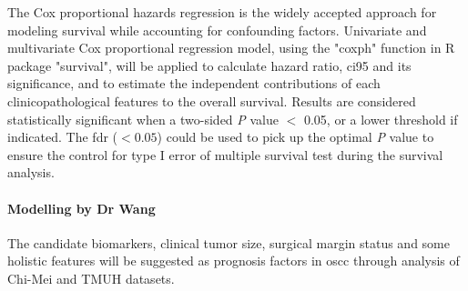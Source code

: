 \documentclass[12pt, a4paper]{article}
\begin{document}

The Cox proportional hazards regression is the widely accepted approach for modeling survival while accounting for confounding factors\cite{Magen2019}. Univariate and multivariate Cox proportional regression model\cite{Andersen1982}, using the "coxph" function in R package "survival", will be applied to calculate hazard ratio, \acrfull{ci95} and its significance, and to estimate the independent contributions of each clinicopathological features to the overall survival.
Results are considered statistically significant when a two-sided \textit{P} value $<$ 0.05, or a lower threshold if indicated.
The \acrfull{fdr} ($< 0.05$) could be used to pick up the optimal \textit{P} value to ensure the control for type I error of multiple survival test during the survival analysis.










\paragraph{Modelling by Dr Wang}

The candidate biomarkers, clinical tumor size, surgical margin status and some holistic features will be suggested as prognosis factors in \acrshort{oscc} through analysis of Chi-Mei and TMUH datasets.
\end{document}
